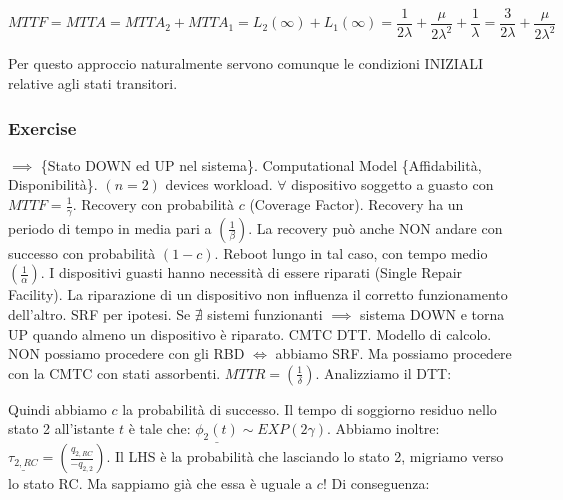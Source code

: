 \[
	MTTF = MTTA = MTTA_2+MTTA_1 = L_2(\infty)+L_1(\infty) = \frac{1}{2\lambda}+\frac{\mu}{2\lambda^2} + \frac{1}{\lambda} = \frac{3}{2\lambda} + \frac{\mu}{2\lambda^2}
\]

Per questo approccio naturalmente servono comunque le condizioni INIZIALI relative agli stati transitori.

\subsubsection{Exercise}

$\implies$ \{Stato DOWN ed UP nel sistema\}. Computational Model \{Affidabilità, Disponibilità\}. $(n=2)$ devices workload. $\forall$ dispositivo soggetto a guasto con $MTTF=\frac{1}{\gamma}$. Recovery con probabilità $c$ (Coverage Factor). Recovery ha un periodo di tempo in media pari a $(\frac{1}{\beta})$. La recovery può anche NON andare con successo con probabilità $(1-c)$. Reboot lungo in tal caso, con tempo medio $(\frac{1}{\alpha})$. I dispositivi guasti hanno necessità di essere riparati (Single Repair Facility). La riparazione di un dispositivo non influenza il corretto funzionamento dell'altro. SRF per ipotesi. Se $\nexists$ sistemi funzionanti $\implies$ sistema DOWN e torna UP quando almeno un dispositivo è riparato. CMTC DTT. Modello di calcolo. NON possiamo procedere con gli RBD $\iff$ abbiamo SRF. Ma possiamo procedere con la CMTC con stati assorbenti. $MTTR=(\frac{1}{\delta})$. Analizziamo il DTT:

\begin{center}
\end{center} 

Quindi abbiamo $c$ la probabilità di successo. Il tempo di soggiorno residuo nello stato 2 all'istante $t$ è tale che: $\underline{\phi_2(t)} \sim EXP(2\gamma)$. Abbiamo inoltre: $\underline{\tau_{2,RC}} = (\frac{q_{2,RC}}{-q_{2,2}})$. Il LHS è la probabilità che lasciando lo stato 2, migriamo verso lo stato RC. Ma sappiamo già che essa è uguale a $c$! Di conseguenza:

